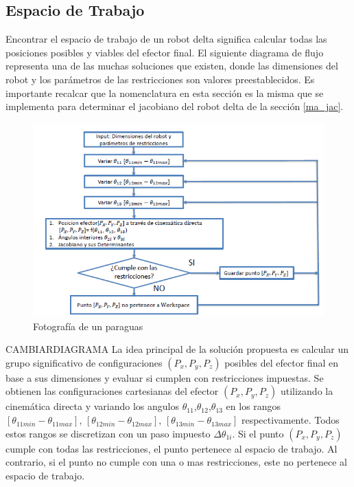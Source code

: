         \newpage

        \newpage

        
    \subsection{Espacio de Trabajo}
     Encontrar el espacio de trabajo de un robot delta significa calcular todas las posiciones posibles y viables del efector final. El siguiente diagrama de flujo representa una de las muchas soluciones que existen, donde las dimensiones del robot y los parámetros de las restricciones son valores preestablecidos. Es importante recalcar que la nomenclatura en esta sección es la misma que se implementa para determinar el jacobiano del robot delta de la sección \ref{ma_jac}.  
    
             \begin{figure}[htb]
                \centering
                \includegraphics[width=1\linewidth]{Main/Chapter6/Images6/cap6_ws_2.png}
                \caption{Fotografía de un paraguas}
                \label{f:Cap6_ws_2}
            \end{figure}  

    CAMBIARDIAGRAMA La idea principal de la solución propuesta es calcular un grupo significativo de configuraciones $(P_x,P_y,P_z)$ posibles del efector final en base a sus dimensiones y evaluar si cumplen con restricciones impuestas. Se obtienen las configuraciones cartesianas del efector $(P_x,P_y,P_z)$  utilizando la cinemática directa y variando los angulos $\theta_{11}$,$\theta_{12}$,$\theta_{13}$ en los rangos $[\theta_{11min}-\theta_{11max}]$, $[\theta_{12min}-\theta_{12max}]$, $[\theta_{13min}-\theta_{13max}]$ respectivamente. Todos estos rangos se discretizan con un paso impuesto \(  \Delta  \theta _{1i} \). Si el punto  $(P_x,P_y,P_z)$ cumple con todas las restricciones, el punto pertenece al espacio de trabajo. Al contrario, si el punto no cumple con una o mas restricciones, este no pertenece al espacio de trabajo.

